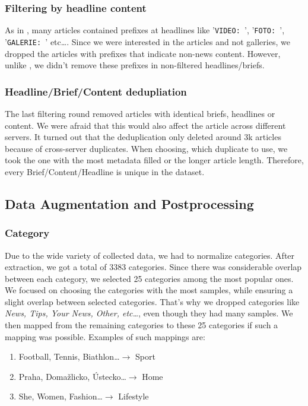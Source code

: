 \subsubsection{Filtering by headline content}
As in \textcite{strakaSumeCzechLargeCzech2018a}, many articles
contained prefixes at headlines like '\verb|VIDEO: |', '\verb|FOTO: |', '\verb|GALERIE: |' etc\dots.
Since we were interested in the articles and not galleries,
we dropped the articles with prefixes that indicate non-news content.
However, unlike \textcite{strakaSumeCzechLargeCzech2018a}, we didn't remove these prefixes
in non-filtered headlines/briefs.




\subsubsection{Headline/Brief/Content dedupliation}
The last filtering round removed articles with identical briefs, headlines or content.
We were afraid that this would also affect the article across different servers.
It turned out that the deduplication only deleted around 3k articles
because of cross-server duplicates.
When choosing, which duplicate to use, we took the one with the most metadata filled
or the longer article length.
Therefore, every Brief/Content/Headline is unique in the dataset.

\subsection{Data Augmentation and Postprocessing}

\subsubsection{Category}
\label{sec:category}
Due to the wide variety of collected data, we had to normalize categories.
After extraction, we got a total of 3383 categories.
Since there was considerable overlap between each category,
we selected 25 categories among the most popular ones.
We focused on choosing the categories with the most samples,
while ensuring a slight overlap between selected categories.
That's why we dropped categories like \textit{News, Tips, Your News, Other, etc\dots},
even though they had many samples.
We then mapped from the remaining categories to these 25 categories if such a mapping was possible.
Examples of such mappings are:
\begin{enumerate}
    \item Football, Tennis, Biathlon\dots $\rightarrow$ Sport
    \item Praha, Domažlicko, Ústecko\dots $\rightarrow$ Home
    \item She, Women, Fashion\dots $\rightarrow$ Lifestyle
\end{enumerate}

